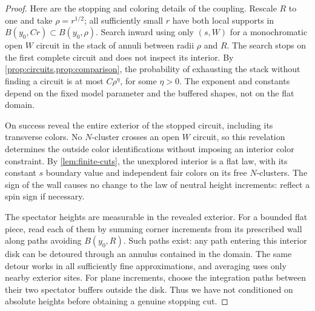 \begin{proof}
Here are the stopping and coloring details of the coupling. Rescale
$R$ to one and take $\rho=r^{1/2}$; all sufficiently small $r$ have
both local supports in $B(y_0,Cr)\subset B(y_0,\rho)$.
Search inward using only $(s,W)$ for a monochromatic open $W$ circuit
in the stack of annuli between radii $\rho$ and $R$. The search stops
on the first complete circuit and does not inspect its interior.
By \cref{prop:circuits,prop:comparison}, the probability of exhausting
the stack without finding a circuit is at most $C\rho^\eta$, for
some $\eta>0$. The exponent and constants depend on the fixed model
parameter and the buffered shapes, not on the flat domain.

On success reveal the entire exterior of the stopped circuit,
including its transverse colors. No $N$-cluster crosses an open
$W$ circuit, so this revelation determines the outside color
identifications without imposing an interior color constraint.
By \cref{lem:finite-cuts}, the unexplored interior is a flat law,
with its constant $s$ boundary value and independent fair colors on
its free $N$-clusters. The sign of the wall causes no change to the
law of neutral height increments: reflect a spin sign if necessary.

The spectator heights are measurable in the revealed exterior.
For a bounded flat piece, read each of them by summing corner
increments from its prescribed wall along paths avoiding
$B(y_0,R)$. Such paths exist: any path entering this interior disk
can be detoured through an annulus contained in the domain. The
same detour works in all sufficiently fine approximations, and
averaging uses only nearby exterior sites. For plane increments,
choose the integration paths between their two spectator buffers
outside the disk. Thus we have not conditioned on absolute heights
before obtaining a genuine stopping cut.


\end{proof}
